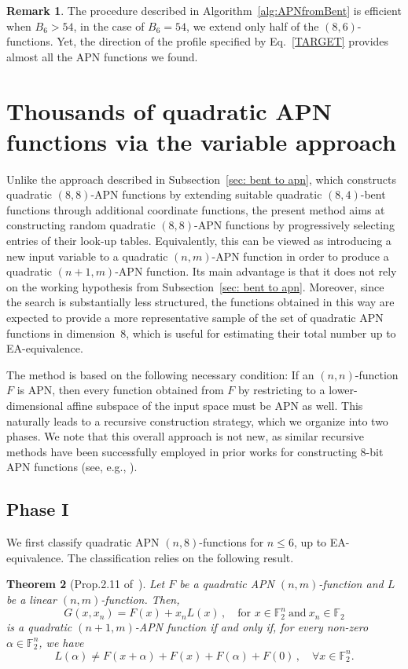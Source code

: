 \documentclass{amsart}[11pt]
\theoremstyle{plain}
\newtheorem{theorem}{Theorem}[section]
\theoremstyle{definition}
\newtheorem{remark}[theorem]{Remark}
\numberwithin{theorem}{section}
\numberwithin{equation}{section}
\numberwithin{table}{section}
\numberwithin{figure}{section}
\numberwithin{algorithm}{section}
\def\F{\mathbb F}
\begin{document}
\begin{remark}
    The procedure described in Algorithm~\ref{alg:APNfromBent} is efficient when $B_6 > 54$, in the case of $B_6 = 54$, we extend only half of the $(8,6)$-functions. Yet, the direction of the profile specified by Eq.~\eqref{TARGET} provides almost all the APN functions we found.
\end{remark}


\section{Thousands of quadratic APN functions via the variable approach}
\label{sec: randomized apn}
Unlike the approach described in Subsection~\ref{sec: bent to apn}, which constructs quadratic $(8,8)$-APN functions by extending suitable quadratic $(8,4)$-bent functions through additional coordinate functions, the present method aims at constructing random quadratic $(8,8)$-APN functions by progressively selecting entries of their look-up tables. Equivalently, this can be viewed as introducing a new input variable to a quadratic $(n,m)$-APN function in order to produce a quadratic $(n+1,m)$-APN function.
Its main advantage is that it does not rely on the working hypothesis from Subsection~\ref{sec: bent to apn}. 
Moreover, since the search is substantially less structured, the functions obtained in this way are expected to provide a more representative sample of the set of quadratic APN functions in dimension~$8$, which is useful for estimating their total number up to EA-equivalence.

The method is based on the following necessary condition: 
If an $(n,n)$-function $F$ is APN, then every function obtained from $F$ by restricting to a lower-dimensional affine subspace of the input space must be APN as well. 
This naturally leads to a recursive construction strategy, which we organize into two phases.
We note that this overall approach is not new, as similar recursive methods have been successfully employed in prior works for constructing 8-bit APN functions (see, e.g., \cite{DBLP:journals/dcc/BeierleLP22}).

\subsection*{Phase I} We first classify quadratic APN $(n,8)$-functions for $n \le 6$, up to EA-equivalence. 
The classification relies on the following result.

\begin{theorem}[Prop.\@ 2.11 of~\cite{DBLP:journals/corr/abs-2501-03922}]
    \label{Thm:dimension_extension}
    Let $F$ be a quadratic APN $(n,m)$-function and $L$ be a linear $(n,m)$-function. 
    Then,
    $$ G(x,x_n) = F(x) + x_n L(x) \,, \quad \text{for } x \in \F_2^n \ \text{and} \  x_n \in \F_2 $$
    is a quadratic $(n+1,m)$-APN function if and only if, for every non-zero $\alpha \in \F_2^n$, we have
    $$ L(\alpha) \neq F(x + \alpha) + F(x) + F(\alpha) + F(0) \,, \quad \forall x \in \F_2^n.$$
\end{theorem}
\end{document}
